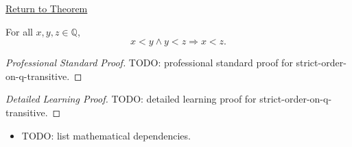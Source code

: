 \newpage
{}
\label{prf:strict-order-on-q-transitive}

\begin{remark*}[Return]
\hyperref[thm:strict-order-on-q-transitive]{Return to Theorem}
\end{remark*}

\begin{theorem*}
For all $x,y,z\in\mathbb{Q}$,
\[
x<y\land y<z \Longrightarrow x<z.
\]
\end{theorem*}

\begin{proof}[Professional Standard Proof]
\LRAProofBodyStart
TODO: professional standard proof for strict-order-on-q-transitive.
\end{proof}

\begin{proof}[Detailed Learning Proof]
\LRAProofBodyStart
TODO: detailed learning proof for strict-order-on-q-transitive.
\end{proof}

\begin{remark*}
\end{remark*}

\begin{dependencies}
\begin{itemize}
  \item TODO: list mathematical dependencies.
\end{itemize}
\end{dependencies}

\clearpage
